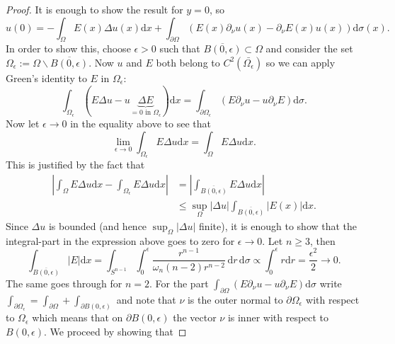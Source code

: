 \documentclass[11pt]{article}
\begin{document}
				\begin{proof}
					It is enough to show the result for $y=0$, so 
					\begin{equation*}
						u(0)=-\int_\Omega E(x)\Delta u(x)\mathrm{d}x+\int_{\partial\Omega}\left(E(x)\partial_\nu u(x)-\partial_\nu E(x)u(x)\right)\mathrm{d}\sigma(x).
					\end{equation*}
					In order to show this, choose $\epsilon>0$ such that $\overline{B(0,\epsilon)}\subset\Omega$ and consider the set $\Omega_\epsilon:=\Omega\backslash\overline{B(0,\epsilon)}$. Now $u$ and $E$ both belong to $C^2(\bar{\Omega_\epsilon})$ so we can apply Green's identity to $E$ in $\Omega_\epsilon$:
					\begin{equation*}
						\int_{\Omega_\epsilon}(E\Delta u-u\underbrace{\Delta E}_{=0\text{ in }\Omega_\epsilon})\mathrm{d}x=\int_{\partial\Omega_\epsilon}(E\partial_\nu u-u\partial_\nu E)\mathrm{d}\sigma.
					\end{equation*} 
					Now let $\epsilon\to0$ in the equality above to see that
					\begin{equation*}
						\lim_{\epsilon\to0}\int_{\Omega_\epsilon} E\Delta u\mathrm{d}x=\int_\Omega E\Delta u\mathrm{d}x.
					\end{equation*}
					This is justified by the fact that 
					\begin{align*}
						|\int_\Omega E\Delta u\mathrm{d}x-\int_{\Omega_\epsilon}E\Delta u\mathrm{d}x|&=|\int_{\overline{B(0,\epsilon)}}E\Delta u\mathrm{d}x|\\
						&\le\sup_\Omega|\Delta u|\int_{\overline{B(0,\epsilon)}}|E(x)|\mathrm{d}x.
					\end{align*}
					Since $\Delta u$ is bounded (and hence $\sup_\Omega|\Delta u|$ finite), it is enough to show that the integral-part in the expression above goes to zero for $\epsilon\to0$. Let $n\ge3$, then
					\begin{equation*}
						\int_{\overline{B(0,\epsilon)}}|E|\mathrm{d}x=\int_{S^{n-1}}\int_0^\epsilon\frac{r^{n-1}}{\omega_n(n-2)r^{n-2}}\,\mathrm{d}r\,\mathrm{d}\sigma\propto\int_0^\epsilon r\mathrm{d}r=\frac{\epsilon^2}{2}\to0.
					\end{equation*}
					The same goes through for $n=2$. For the part $\int_{\partial\Omega}(E\partial_\nu u-u\partial_\nu E)\mathrm{d}\sigma$ write $\int_{\partial\Omega_\epsilon}=\int_{\partial\Omega}+\int_{\partial B(0,\epsilon)}$ and note that $\nu$ is the outer normal to $\partial\Omega_\epsilon$ with respect to $\Omega_\epsilon$ which means that on $\partial B(0,\epsilon)$ the vector $\nu$ is inner with respect to $B(0,\epsilon)$. We proceed by showing that

\end{proof}
\end{document}
